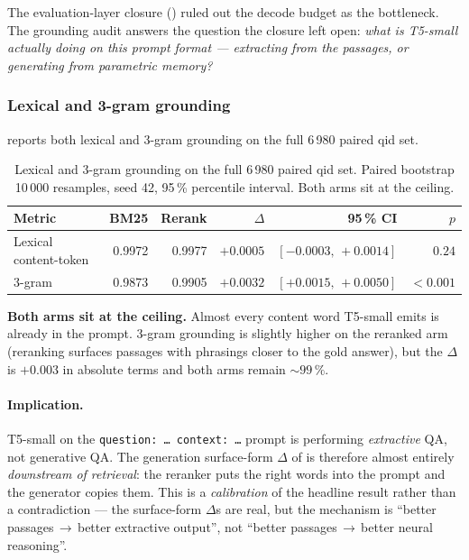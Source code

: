 \documentclass[11pt,a4paper]{article}
\newcommand{\fdev}{6\,980}
\newcommand{\bmtwofive}{BM25}
\newcommand{\barrow}{\,\allowbreak\ensuremath{\rightarrow}\allowbreak\,}
\begin{document}
The evaluation-layer closure () ruled out the decode budget
as the bottleneck.  The grounding audit answers the question the closure left open:
\emph{what is T5-small actually doing on this prompt format ---
extracting from the passages, or generating from parametric
memory?}

\subsubsection{Lexical and 3-gram grounding}

 reports both lexical and 3-gram grounding
on the full \fdev{} paired qid set.

\begin{table}[H]
  \centering
  \caption{Lexical and 3-gram grounding on the full \fdev{}
  paired qid set.  Paired bootstrap 10\,000 resamples, seed 42,
  95\,\% percentile interval.  Both arms sit at the ceiling.}
  \label{tab:w7-lex-ngram}
  \begin{tabular}{lrrrrr}
    \toprule
    Metric             & \bmtwofive{} & Rerank & $\Delta$ & 95\,\% CI & $p$ \\
    \midrule
    Lexical content-token & 0.9972 & 0.9977 & $+0.0005$ & $[-0.0003,\,+0.0014]$ & $0.24$ \\
    3-gram                & 0.9873 & 0.9905 & $+0.0032$ & $[+0.0015,\,+0.0050]$ & $<\!0.001$ \\
    \bottomrule
  \end{tabular}
\end{table}

\textbf{Both arms sit at the ceiling.}  Almost every content word
T5-small emits is already in the prompt.  3-gram grounding is
slightly higher on the reranked arm
(reranking surfaces passages with phrasings closer to the gold
answer), but the $\Delta$ is $+0.003$ in absolute terms and both
arms remain $\sim\!99\,\%$.

\paragraph{Implication.}  T5-small on the
\texttt{question:\ \ldots\ context:\ \ldots} prompt is performing
\emph{extractive} QA, not generative QA.  The generation surface-form
$\Delta$ of  is therefore almost entirely
\emph{downstream of retrieval}: the reranker puts the right words
into the prompt and the generator copies them.  This is a
\emph{calibration} of the headline result rather than a
contradiction --- the surface-form $\Delta$s are real, but the
mechanism is ``better passages\barrow{}better extractive output'',
not ``better passages\barrow{}better neural reasoning''.
\end{document}
